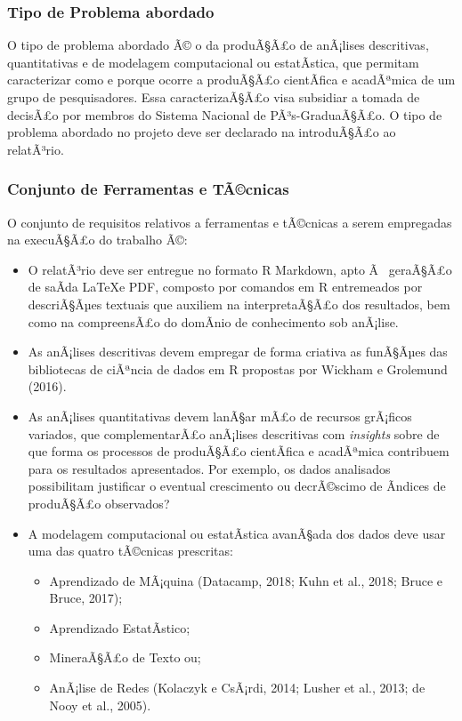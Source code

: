 \documentclass[]{article}
\providecommand{\tightlist}{%
  \setlength{\itemsep}{0pt}\setlength{\parskip}{0pt}}
\begin{document}
\subsubsection{Tipo de Problema
abordado}\label{tipo-de-problema-abordado}

O tipo de problema abordado Ã© o da produÃ§Ã£o de anÃ¡lises descritivas,
quantitativas e de modelagem computacional ou estatÃ­stica, que permitam
caracterizar como e porque ocorre a produÃ§Ã£o cientÃ­fica e acadÃªmica
de um grupo de pesquisadores. Essa caracterizaÃ§Ã£o visa subsidiar a
tomada de decisÃ£o por membros do Sistema Nacional de PÃ³s-GraduaÃ§Ã£o.
O tipo de problema abordado no projeto deve ser declarado na
introduÃ§Ã£o ao relatÃ³rio.

\subsubsection{Conjunto de Ferramentas e
TÃ©cnicas}\label{conjunto-de-ferramentas-e-tacnicas}

O conjunto de requisitos relativos a ferramentas e tÃ©cnicas a serem
empregadas na execuÃ§Ã£o do trabalho Ã©:

\begin{itemize}
\tightlist
\item
  O relatÃ³rio deve ser entregue no formato R Markdown, apto Ã~
  geraÃ§Ã£o de saÃ­da \LaTeX e PDF, composto por comandos em R
  entremeados por descriÃ§Ãµes textuais que auxiliem na interpretaÃ§Ã£o
  dos resultados, bem como na compreensÃ£o do domÃ­nio de conhecimento
  sob anÃ¡lise.
\item
  As anÃ¡lises descritivas devem empregar de forma criativa as funÃ§Ãµes
  das bibliotecas de ciÃªncia de dados em R propostas por Wickham e
  Grolemund (2016).
\item
  As anÃ¡lises quantitativas devem lanÃ§ar mÃ£o de recursos grÃ¡ficos
  variados, que complementarÃ£o anÃ¡lises descritivas com
  \emph{insights} sobre de que forma os processos de produÃ§Ã£o
  cientÃ­fica e acadÃªmica contribuem para os resultados apresentados.
  Por exemplo, os dados analisados possibilitam justificar o eventual
  crescimento ou decrÃ©scimo de Ã­ndices de produÃ§Ã£o observados?
\item
  A modelagem computacional ou estatÃ­stica avanÃ§ada dos dados deve
  usar uma das quatro tÃ©cnicas prescritas:

  \begin{itemize}
  \tightlist
  \item
    Aprendizado de MÃ¡quina (Datacamp, 2018; Kuhn et al., 2018; Bruce e
    Bruce, 2017);
  \item
    Aprendizado EstatÃ­stico;
  \item
    MineraÃ§Ã£o de Texto ou;
  \item
    AnÃ¡lise de Redes (Kolaczyk e CsÃ¡rdi, 2014; Lusher et al., 2013; de
    Nooy et al., 2005).
  \end{itemize}
\end{itemize}
\end{document}
